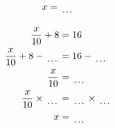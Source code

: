 \documentclass[12pt]{article}
\newcounter{minipagecount}
\begin{document}
\begin{multicols}{2}
\begin{minipage}[t]{0.45\textwidth}
\begin{align*}
        x &= \dotuline{\hspace{5mm}}\\
    \end{align*}
\end{minipage}\columnbreak
\noindent{(\theminipagecount)}\hspace{0.1mm} %
\begin{minipage}[t]{0.45\textwidth} %
    \vspace{-26pt}  %
    \raggedright %
    \begin{align*} %
        \frac{x}{10} + 8 &= 16\\
        \frac{x}{10} + 8 - \dotuline{\hspace{5mm}} &= 16 - \dotuline{\hspace{5mm}}\\
        \frac{x}{10} &= \dotuline{\hspace{5mm}}\\
        \frac{x}{10} \times\dotuline{\hspace{5mm}} &= \dotuline{\hspace{5mm}} \times\dotuline{\hspace{5mm}}\\
        x &= \dotuline{\hspace{5mm}}\\
    \end{align*}
\end{minipage} %
\noindent{(\theminipagecount)}\hspace{0.1mm} %
\begin{minipage}[t]{0.45\textwidth} %
    \vspace{-26pt}  %

\end{minipage}
\end{multicols}
\end{document}
